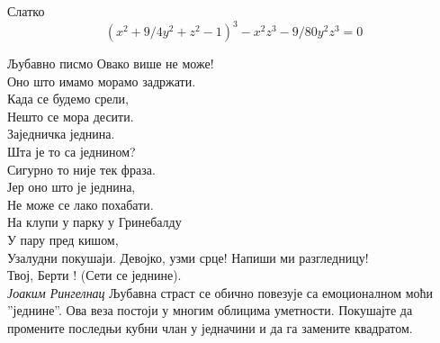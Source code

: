 \begin{surferPage}{Слатко}
\smallskip
\[(x^2+ 9/4y^2	+ z^2- 1)^3- x^2z^3	- 9/80y^2z^3	= 0\]

\singlespacing
Љубавно писмо
\singlespacing
Овако више не може!\\
Оно што имамо морамо задржати.\\
Када се будемо срели,\\
Нешто се мора десити.\\
Заједничка једнина.\\
Шта је то са једнином?\\
Сигурно то није тек фраза.\\
Јер оно што је једнина,\\
Не може се лако похабати.\\
На клупи у парку у Гринебалду\\
У пару пред кишом,\\
Узалудни покушаји. Девојко, узми срце! Напиши ми разгледницу!\\
Твој, Берти ! (Сети се једнине).\\
{\it Јоаким Рингелнац}
\singlespacing 
Љубавна страст се обично повезује са емоционалном моћи ''једнине''. Ова веза постоји у многим облицима уметности.
\singlespacing 
Покушајте да промените последњи кубни члан у једначини и да га замените квадратом.
\end{surferPage}
